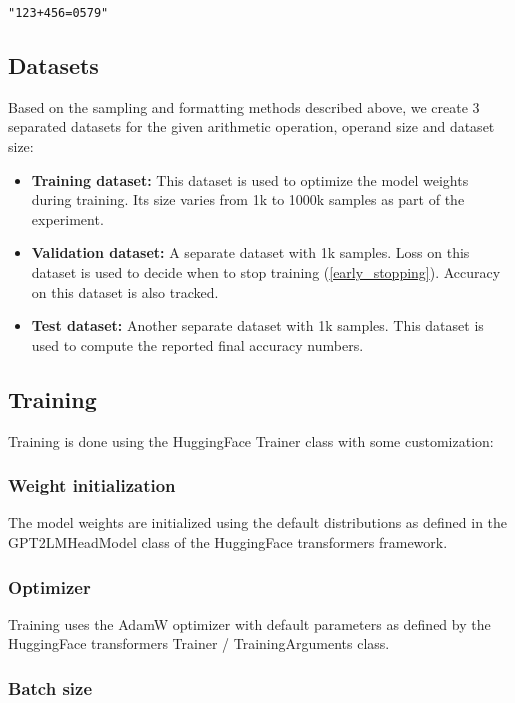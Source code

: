 \begin{verbatim}
"123+456=0579"
\end{verbatim}

\subsection{Datasets}

Based on the sampling and formatting methods described above, we create 3 separated datasets for the given arithmetic operation, operand size and dataset size:

\begin{itemize}
	\item \textbf{Training dataset:} This dataset is used to optimize the model weights during training. Its size varies from 1k to 1000k samples as part of the experiment.
	\item \textbf{Validation dataset:} A separate dataset with 1k samples. Loss on this dataset is used to decide when to stop training (\cref{early_stopping}). Accuracy on this dataset is also tracked.
	\item \textbf{Test dataset:} Another separate dataset with 1k samples. This dataset is used to compute the reported final accuracy numbers.
\end{itemize} 

\subsection{Training}

Training is done using the HuggingFace Trainer class with some customization:

\subsubsection{Weight initialization}

The model weights are initialized using the default distributions as defined in the GPT2LMHeadModel class of the HuggingFace transformers framework.

\subsubsection{Optimizer}

Training uses the AdamW optimizer with default parameters as defined by the HuggingFace transformers Trainer / TrainingArguments class.

\subsubsection{Batch size}

